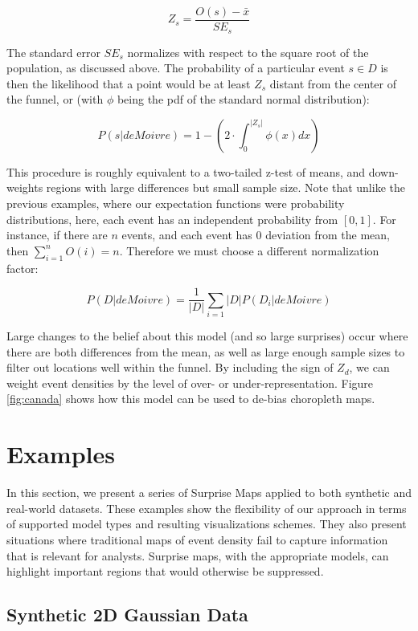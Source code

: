 \documentclass[journal]{vgtc}                %
\begin{document}
$$ Z_s = \frac{O(s)-\bar{x}}{SE_s} $$

The standard error $SE_s$ normalizes with respect to the square root of the population, as discussed above. The probability of a particular event $s \in D$ is then the likelihood that a point would be at least $Z_s$ distant from the center of the funnel, or (with $\phi$ being the pdf of the standard normal distribution):

$$P(s|de Moivre) = 1-(2\cdot\int_0^{|Z_s|} \phi(x)dx) $$

This procedure is roughly equivalent to a two-tailed z-test of means, and down-weights regions with large differences but small sample size. Note that unlike the previous examples, where our expectation functions were probability distributions, here, each event has an independent probability from $[0,1]$. For instance, if there are $n$ events, and each event has $0$ deviation from the mean, then $\sum_{i=1}^{n} O(i) = n$. Therefore we must choose a different normalization factor:

$$ P(D|de Moivre) = \frac{1}{|D|}\sum_{i=1}{|D|}P(D_i|de Moivre)$$

Large changes to the belief about this model (and so large surprises) occur where there are both differences from the mean, as well as large enough sample sizes to filter out locations well within the funnel. By including the sign of $Z_d$, we can weight event densities by the level of over- or under-representation. Figure \ref{fig:canada} shows how this model can be used to de-bias choropleth maps.

\section{Examples}
\label{sec:examples}

In this section, we present a series of Surprise Maps applied to both synthetic and real-world datasets. These examples show the flexibility of our approach in terms of supported model types and resulting visualizations schemes. They also present situations where traditional maps of event density fail to capture information that is relevant for analysts. Surprise maps, with the appropriate models, can highlight important regions that would otherwise be suppressed.

\subsection{Synthetic 2D Gaussian Data}
\label{sec:synthetic}
\gaussMaps
\gaussFig
\end{document}
